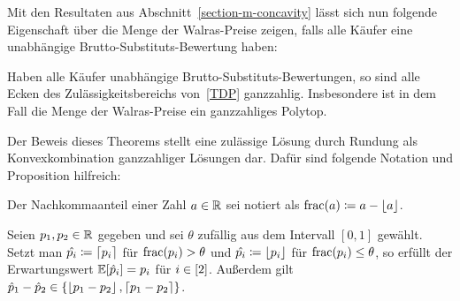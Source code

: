 Mit den Resultaten aus Abschnitt~\ref{section-m-concavity} lässt sich nun folgende Eigenschaft über die Menge der Walras-Preise zeigen, falls alle Käufer eine unabhängige Brutto-Substituts-Bewertung haben:

\begin{theorem}\label{thm-walras-prices-integral-polytope}
	Haben alle Käufer unabhängige Brutto-Substituts-Bewertungen, so sind alle Ecken des Zulässigkeitsbereichs von~\eqref{TDP} ganzzahlig.
	Insbesondere ist in dem Fall die Menge der Walras-Preise ein ganzzahliges Polytop.
\end{theorem}
Der Beweis dieses Theorems stellt eine zulässige Lösung durch Rundung als Konvexkombination ganzzahliger Lösungen dar.
Dafür sind folgende Notation und Proposition hilfreich:
\begin{notation}
	Der Nachkommaanteil einer Zahl $a\in\mathbb{R}$ sei notiert als $\operatorname{frac}(a)\coloneqq a - \left\lfloor a \right\rfloor$.
\end{notation}
\begin{proposition}\label{prop-integral-polytop-helper}
	Seien $p_1,p_2\in\mathbb{R}$ gegeben und sei $\theta$ zufällig aus dem Intervall $[0,1]$ gewählt.
	Setzt man $\hat{p_i}\coloneqq \left\lceil p_i \right\rceil$ für $\operatorname{frac}(p_i)> \theta$ und $\hat{p_i}\coloneqq \left\lfloor p_i \right\rfloor$ für $\operatorname{frac}(p_i) \leq \theta$, so erfüllt der Erwartungswert $\mathbb{E}[\hat{p}_i] = p_i$ für $i\in\left[ 2 \right]$.
	Außerdem gilt $\hat{p}_1 - \hat{p}_2 \in \{ \left\lfloor p_1 - p_2 \right\rfloor, \left\lceil p_1 - p_2 \right\rceil \}$.
\end{proposition}
